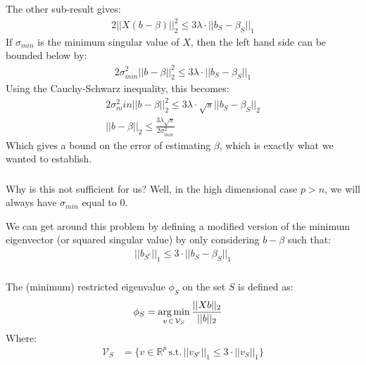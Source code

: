 \begin{frame}[fragile] \frametitle{}

The other sub-result gives:
\begin{align*}
2 || X (b - \beta) ||_2^2 \leq 3 \lambda \cdot || b_S - \beta_S ||_1
\end{align*}
\pause If $\sigma_{min}$ is the minimum singular value of $X$, then the
left hand side can be bounded below by:
\begin{align*}
2 \sigma^2_{min} || b - \beta ||_2^2 \leq 3 \lambda \cdot || b_S - \beta_S ||_1
\end{align*}
\pause Using the Cauchy-Schwarz inequality, this becomes:
\begin{align*}
2 \sigma^2_min || b - \beta ||_2^2 \leq 3 \lambda \cdot \sqrt{s} || b_S - \beta_S ||_2\\
|| b - \beta ||_2 \leq \frac{3 \lambda \sqrt{s}}{2\sigma^2_{min}}
\end{align*}
Which gives a bound on the error of estimating $\beta$, which is exactly what we wanted
to establish.

\end{frame}

\begin{frame}[fragile] \frametitle{}

Why is this not sufficient for us? Well, in the high dimensional case $p > n$, we will
always have $\sigma_{min}$ equal to $0$.

\pause We can get around this problem by defining a modified version of the minimum
eigenvector (or squared singular value) by only considering $b - \beta$ such that:
\begin{align*}
|| b_{S^c} ||_1 \leq 3 \cdot || b_S - \beta_S ||_1
\end{align*}

\end{frame}

\begin{frame}[fragile] \frametitle{}

The (minimum) restricted eigenvalue $\phi_S$ on the set $S$ is defined as:
\begin{align*}
\phi_S &= \mathop{\mathrm{arg\,min}}_{v \, \in \, \mathcal{V}_S} \frac{|| X b ||_2}{|| b ||_2}
\end{align*}
Where:
\begin{align*}
\mathcal{V}_S &= \{ v \in \mathbb{R}^p \, \text{s.t.} \, || v_{S^c} ||_1 \leq 3 \cdot || v_S ||_1  \}
\end{align*}

\end{frame}

